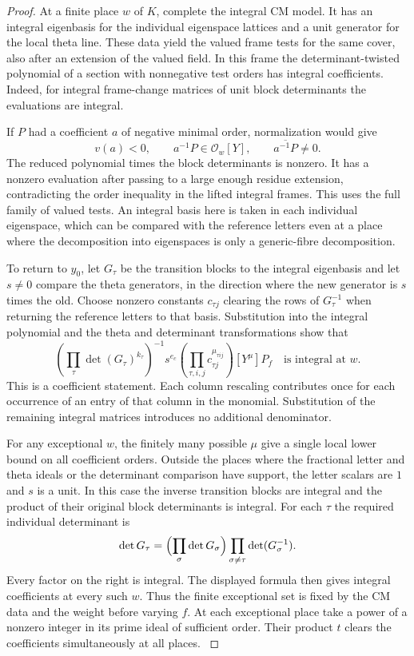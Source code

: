 \begin{proof}
At a finite place \(w\) of \(K\), complete the integral CM
model. It has an integral eigenbasis for the individual
eigenspace lattices and a unit generator for the local theta
line. These data yield the valued frame tests for the same
cover, also after an extension of the valued field. In this
frame the determinant-twisted polynomial of a section with
nonnegative test orders has integral coefficients. Indeed, for
integral frame-change matrices of unit block determinants the
evaluations are integral.

If \(P\) had a coefficient \(a\) of negative minimal order, normalization would give
\[
 v(a)<0,\qquad a^{-1}P\in\mathcal O_w[Y],\qquad \overline{a^{-1}P}\ne0.
\]
The reduced polynomial times the block determinants is
nonzero. It has a nonzero evaluation after passing to a large
enough residue extension, contradicting the order inequality in
the lifted integral frames. This uses the full family of valued
tests. An integral basis here is taken in each individual
eigenspace, which can be compared with the reference letters
even at a place where the decomposition into eigenspaces is
only a generic-fibre decomposition.
\label{cor:deep-cover-denominators-4}

To return to \(y_0\), let \(G_\tau\) be the transition blocks
to the integral eigenbasis and let \(s\ne0\) compare the theta
generators, in the direction where the new generator is \(s\)
times the old. Choose nonzero constants \(c_{\tau j}\) clearing
the rows of \(G_\tau^{-1}\) when returning the reference letters
to that basis. Substitution into the integral polynomial and
the theta and determinant transformations show that
\[
 \left(\prod_\tau\det(G_\tau)^{k_\tau}\right)^{-1}
 s^{e_c}\left(\prod_{\tau,i,j}c_{\tau j}^{\mu_{\tau ij}}\right)
 [Y^\mu]P_f\quad\text{is integral at }w .
\]
This is a coefficient statement. Each column rescaling
contributes once for each occurrence of an entry of that column
in the monomial. Substitution of the remaining integral
matrices introduces no additional denominator.

For any exceptional \(w\), the finitely many possible \(\mu\)
give a single local lower bound on all coefficient orders.
Outside the places where the fractional letter and theta ideals
or the determinant comparison have support, the letter scalars
are \(1\) and \(s\) is a unit. In this case the inverse
transition blocks are integral and the product of their
original block determinants is integral. For each \(\tau\) the required individual determinant is
\[
 \det G_\tau=\Bigl(\prod_\sigma\det G_\sigma\Bigr)\prod_{\sigma\ne\tau}\det(G_\sigma^{-1}).
\]
Every factor on the right is integral. The displayed
formula then gives integral coefficients at every such \(w\).
Thus the finite exceptional set is fixed by the CM data and
the weight before varying \(f\). At each exceptional place
take a power of a nonzero integer in its prime ideal of
sufficient order. Their product \(t\) clears the coefficients
simultaneously at all places.
\label{cor:deep-cover-denominators-5}


\end{proof}
